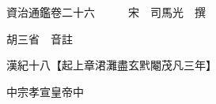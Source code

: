 










 


 
 


 

  
  
  
  
  





  
  
  
  
  
 
  

  

  
  
  



  

 
 

  
   




  

  
  


  　　資治通鑑卷二十六　　　宋　司馬光　撰

　　胡三省　音註

　　漢紀十八【起上章涒灘盡玄黓閹茂凡三年】

　　中宗孝宣皇帝中

